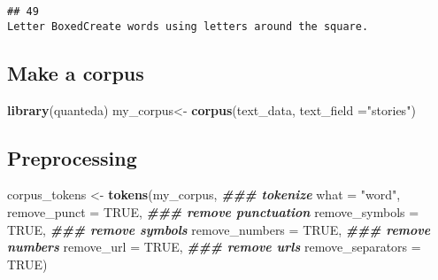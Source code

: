 \documentclass[
]{article}
\newenvironment{Shaded}{\begin{snugshade}}{\end{snugshade}}
\newcommand{\AttributeTok}[1]{\textcolor[rgb]{0.13,0.29,0.53}{#1}}
\newcommand{\ConstantTok}[1]{\textcolor[rgb]{0.56,0.35,0.01}{#1}}
\newcommand{\DocumentationTok}[1]{\textcolor[rgb]{0.56,0.35,0.01}{\textbf{\textit{#1}}}}
\newcommand{\FunctionTok}[1]{\textcolor[rgb]{0.13,0.29,0.53}{\textbf{#1}}}
\newcommand{\NormalTok}[1]{#1}
\newcommand{\OtherTok}[1]{\textcolor[rgb]{0.56,0.35,0.01}{#1}}
\newcommand{\StringTok}[1]{\textcolor[rgb]{0.31,0.60,0.02}{#1}}
\begin{document}
\begin{verbatim}
## 49                                                                                                                                                                                                                                                                                                                                                             Letter BoxedCreate words using letters around the square.
\end{verbatim}

\hypertarget{make-a-corpus}{%
\subsection{Make a corpus}\label{make-a-corpus}}

\begin{Shaded}
\begin{Highlighting}[]
\FunctionTok{library}\NormalTok{(quanteda)}
\NormalTok{my\_corpus}\OtherTok{\textless{}{-}} \FunctionTok{corpus}\NormalTok{(text\_data, }\AttributeTok{text\_field =}\StringTok{"stories"}\NormalTok{)}
\end{Highlighting}
\end{Shaded}

\hypertarget{preprocessing}{%
\subsection{Preprocessing}\label{preprocessing}}

\begin{Shaded}
\begin{Highlighting}[]
\NormalTok{corpus\_tokens }\OtherTok{\textless{}{-}} \FunctionTok{tokens}\NormalTok{(my\_corpus,                                     }\DocumentationTok{\#\#\# tokenize }
                       \AttributeTok{what =} \StringTok{"word"}\NormalTok{,    }
                       \AttributeTok{remove\_punct =} \ConstantTok{TRUE}\NormalTok{,                            }\DocumentationTok{\#\#\# remove punctuation  }
                       \AttributeTok{remove\_symbols =} \ConstantTok{TRUE}\NormalTok{,                          }\DocumentationTok{\#\#\# remove symbols }
                       \AttributeTok{remove\_numbers =} \ConstantTok{TRUE}\NormalTok{,                          }\DocumentationTok{\#\#\# remove numbers }
                       \AttributeTok{remove\_url =} \ConstantTok{TRUE}\NormalTok{,                              }\DocumentationTok{\#\#\# remove urls }
                       \AttributeTok{remove\_separators =} \ConstantTok{TRUE}\NormalTok{)    }
\end{Highlighting}
\end{Shaded}
\end{document}
